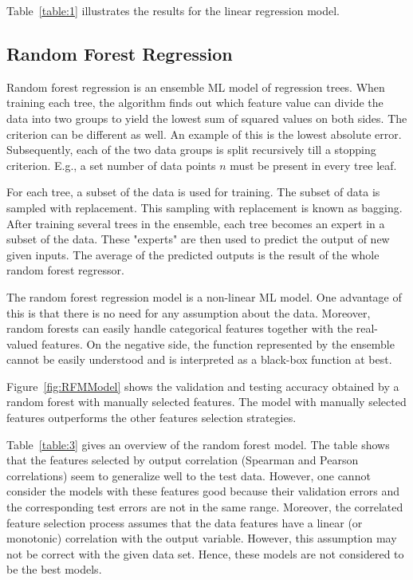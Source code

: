 \documentclass[11pt]{article}
\begin{document}
Table~\ref{table:1} illustrates the results for the linear regression model.

\subsection{Random Forest Regression}
\label{RandomForestRegressionLabel}
Random forest regression is an ensemble ML model of regression trees.
When training each tree,  the algorithm finds out which feature value can divide the data into two groups to yield the lowest sum of squared values on both sides. The criterion can be different as well. An example of this is the lowest absolute error.
Subsequently, each of the two data groups is split recursively till a stopping criterion. E.g., a set number of data points $n$ must be present in every tree leaf.

For each tree,  a subset of the data is used for training. 
The subset of data is sampled with replacement. This sampling with replacement is known as bagging.
After training several trees in the ensemble, each tree becomes an expert in a subset of the data. These "experts" are then used to predict the output of new given inputs.
The average of the predicted outputs is the result of the whole random forest regressor.

The random forest regression model is a non-linear ML model.
One advantage of this is that there is no need for any assumption about the data.
Moreover, random forests can easily handle categorical features together with the real-valued features.
On the negative side,  the function represented by the ensemble cannot be easily understood and is interpreted as a black-box function at best.

Figure~\ref{fig:RFMModel} shows the validation and testing accuracy obtained by a random forest with manually selected features.
The model with manually selected features outperforms the other features selection strategies.

Table~\ref{table:3} gives an overview of the random forest model.
The table shows that the features selected by output correlation (Spearman and Pearson correlations) seem to generalize well to the test data.
However,  one cannot consider the models with these features good because their validation errors and the corresponding test errors are not in the same range.
Moreover,  the correlated feature selection process assumes that the data features have a linear (or monotonic) correlation with the output variable. However, this assumption may not be correct with the given data set. Hence, these models are not considered to be the best models.
\end{document}
